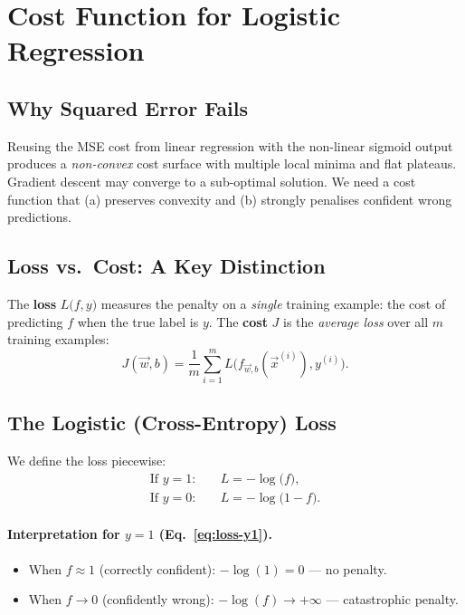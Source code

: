 \section{Cost Function for Logistic Regression}
\label{sec:logcost}

\subsection{Why Squared Error Fails}

Reusing the MSE cost from linear regression with the non-linear sigmoid output
produces a \emph{non-convex} cost surface with multiple local minima and flat
plateaus. Gradient descent may converge to a sub-optimal solution. We need a
cost function that (a) preserves convexity and (b) strongly penalises confident
wrong predictions.

\subsection{Loss vs.\ Cost: A Key Distinction}

\begin{definition}
The \textbf{loss} $L\bigl(f,y\bigr)$ measures the penalty on a \emph{single}
training example: the cost of predicting $f$ when the true label is $y$.
The \textbf{cost} $J$ is the \emph{average loss} over all $m$ training examples:
\[J(\vec{w},b)=\frac{1}{m}\sum_{i=1}^m L\!\bigl(f_{\vec{w},b}(\vec{x}^{(i)}),y^{(i)}\bigr).\]
\end{definition}

\subsection{The Logistic (Cross-Entropy) Loss}

We define the loss piecewise:
\begin{align}
\text{If }y=1:&\quad L=-\log\!\bigl(f\bigr),\label{eq:loss-y1}\\
\text{If }y=0:&\quad L=-\log\!\bigl(1-f\bigr).\label{eq:loss-y0}
\end{align}

\paragraph{Interpretation for $y=1$ (Eq.~\ref{eq:loss-y1}).}
\begin{itemize}
\item When $f\approx 1$ (correctly confident): $-\log(1)=0$ — no penalty.
\item When $f\to 0$ (confidently wrong): $-\log(f)\to+\infty$ — catastrophic penalty.
\end{itemize}

